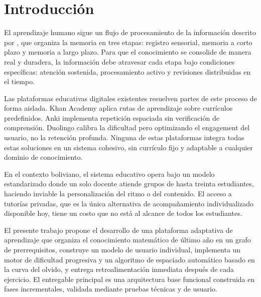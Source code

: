 \documentclass{univalle-perfil}
\begin{document}
\makecaratula

\tableofcontents
\listoffigures


\section{Introducción}

El aprendizaje humano sigue un flujo de procesamiento de la información descrito por \textcite{atkinson1968}, que organiza la memoria en tres etapas: registro sensorial, memoria a corto plazo y memoria a largo plazo. Para que el conocimiento se consolide de manera real y duradera, la información debe atravesar cada etapa bajo condiciones específicas: atención sostenida, procesamiento activo y revisiones distribuidas en el tiempo.

Las plataformas educativas digitales existentes resuelven partes de este proceso de forma aislada. Khan Academy aplica rutas de aprendizaje sobre currículos predefinidos. Anki implementa repetición espaciada sin verificación de comprensión. Duolingo calibra la dificultad pero optimizando el engagement del usuario, no la retención profunda. Ninguna de estas plataformas integra todas estas soluciones en un sistema cohesivo, sin currículo fijo y adaptable a cualquier dominio de conocimiento.

En el contexto boliviano, el sistema educativo opera bajo un modelo estandarizado donde un solo docente atiende grupos de hasta treinta estudiantes, haciendo inviable la personalización del ritmo o del contenido. El acceso a tutorías privadas, que es la única alternativa de acompañamiento individualizado disponible hoy, tiene un costo que no está al alcance de todos los estudiantes.

El presente trabajo propone el desarrollo de una plataforma adaptativa de aprendizaje que organiza el conocimiento matemático de último año en un grafo de prerrequisitos, construye un modelo de usuario individual, implementa un motor de dificultad progresiva y un algoritmo de espaciado automático basado en la curva del olvido, y entrega retroalimentación inmediata después de cada ejercicio. El entregable principal es una arquitectura base funcional construida en fases incrementales, validada mediante pruebas técnicas y de usuario.
\end{document}
